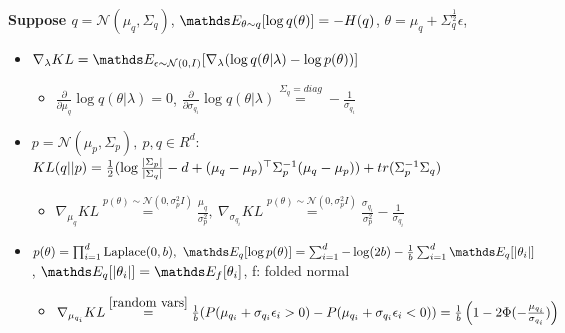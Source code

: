 \textbf{Suppose $q = \mathcal{N}(\mu_{q}, \Sigma_{q})$},
$\E[\theta \sim q]{\log q(\theta)} = -H(q)$, $\theta = \mu_{q} + \Sigma_{q}^{\frac{1}{2}}\epsilon$,
\begin{itemize}
    \item $\nabla_{\lambda} KL = \E[\epsilon \sim \mathcal{N}(0,I)]{\nabla_{\lambda} (\log q(\theta| \lambda) - \log p(\theta))}$
    \begin{itemize}
        \item $\frac{\partial}{\partial \mu_{q}} \log q(\theta|\lambda) =0$, $\frac{\partial}{\partial \sigma_{q_{i}}} \log q(\theta|\lambda) \overset{\Sigma_{q}=diag}{=} -\frac{1}{\sigma_{q_{i}}} $
    \end{itemize}
    \item $p=\mathcal{N}(\mu_{p}, \Sigma_{p}),\ p,q \in R^{d}$: $KL(q||p) = \frac{1}{2}(\log \frac{\left\lvert\Sigma_{p}\right\rvert}{\left\lvert\Sigma_{q}\right\rvert} -d +
        (\mu_{q}-\mu_{p})^{\top}\Sigma_{p}^{-1}(\mu_{q}-\mu_{p})) + tr(\Sigma_{p}^{-1} \Sigma_{q})$
    \begin{itemize}
        \item $\nabla_{\mu_{q}}KL \overset{p(\theta) \sim \mathcal{N}(0, \sigma_{p}^{2}I)}{=} \frac{\mu_{q}}{\sigma_{p}^{2}},\
        \nabla_{\sigma_{q_{i}}}KL \overset{p(\theta) \sim \mathcal{N}(0, \sigma_{p}^{2}I)}{=} \frac{\sigma_{q_{i}}}{\sigma_{p}^{2}}-
        \frac{1}{\sigma_{q_{i}}}$
    \end{itemize}
    \item
    $p(\theta) = \prod_{i=1}^{d} \text{Laplace}(0, b),\ \E[q]{\log p(\theta)} = \sum_{i=1}^{d}-\log(2b)
    - \frac{1}{b} \sum_{i=1}^{d}\E[q]{\abs{\theta_{i}}}$, $\E[q]{\abs{\theta_{i}}} = \E[f]{\theta_{i}}$,
    f: folded normal
    \begin{itemize}
        \item $\nabla_{\mu_{q_{i}}}KL \overset{\ref{random vars}}{=} \frac{1}{b}(P(\mu_{q_{i}}+\sigma_{q_{i}}\epsilon_{i} >0)-
        P(\mu_{q_{i}}+\sigma_{q_{i}}\epsilon_{i} < 0)) =
        \frac{1}{b}\left(1-2\Phi(-\frac{\mu_{q_{i}}}{\sigma_{q_{i}}})\right)$
    \end{itemize}
\end{itemize}


